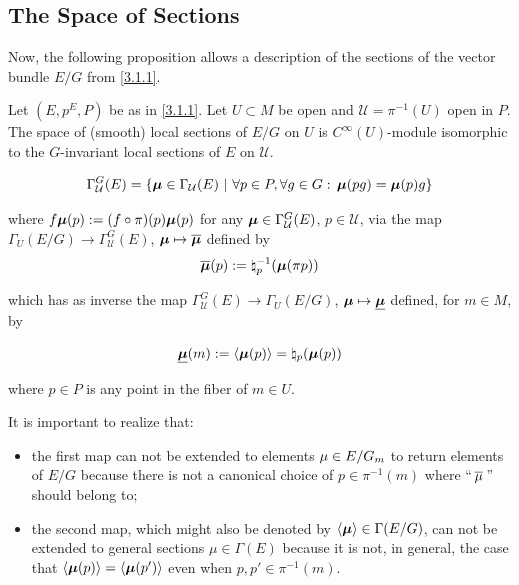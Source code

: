 \subsection{The Space of Sections}

Now, the following proposition allows a description of the sections of the vector bundle $E/G$ from \ref{3.1.1}.

\begin{proposition}\label{3.1.3}
Let $(E, p^E, P)$ be as in \ref{3.1.1}. Let $U \subset M$ be open and $\mathcal U = \pi^{-1}(U)$ open in $P$. The space of (smooth) local sections of $E/G$ on $U$ is $C^\infty(U)$-module isomorphic to the $G$-invariant local sections of $E$ on $\mathcal U$.

\[ 
    \Gamma_{\mathcal U}^G(E) = \left\{ \bm{\mu} \in \Gamma_{\mathcal U}(E) \ |\  \forall p \in P, \forall g \in G:\, \bm{\mu}(pg) = \bm{\mu}(p)g \right\}
\] 

where $f \bm{\mu} (p) := (f \circ \pi)(p) \bm{\mu}(p)$ for any $\bm{\mu} \in \Gamma_{\mathcal U}^G(E)$, $p \in \mathcal U$, via the map $\Gamma_U(E/G) \to \Gamma_{\mathcal U}^G(E)$, $\bm{\mathfrak{\mu}} \mapsto \overline{\bm{\mathfrak{\mu}}}$ defined by 
\[
    \overline{\bm{\mathfrak{\mu}}}(p) := \natural_p^{-1}(\bm{\mathfrak{\mu}}(\pi p))
\] %

which has as inverse the map $\Gamma_{\mathcal U}^G(E) \to \Gamma_U(E/G)$, $\bm{\mu} \mapsto \underline{\bm{\mu}}$ defined, for $m \in M$, by

\[
    \underline{\bm{\mu}}(m) := \left\langle \bm{\mu}(p) \right\rangle = \natural_p(\bm{\mu}(p))
\]

where $p \in P$ is any point in the fiber of $m \in U$.
\end{proposition}

It is important to realize that:

\begin{itemize}
    \item the first map can not be extended to elements $\mathfrak{\mu} \in E/G_m$ to return elements of $E/G$ because there is not a canonical choice of $p \in \pi^{-1}(m)$ where ``$\,\overline{\mathfrak{\mu}}\,$'' should belong to;
    
    \item the second map, which might also be denoted by $\left\langle \bm{\mu} \right\rangle \in \Gamma(E/G)$, can not be extended to general sections $\mu \in \Gamma(E)$ because it is not, in general, the case that $\left\langle \bm{\mu}(p) \right\rangle = \left\langle \bm{\mu}(p') \right\rangle$ even when $p, p' \in \pi^{-1}(m)$.
\end{itemize}

